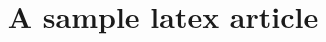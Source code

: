 \documentclass[12pt]{article}
\begin{document}
    \title{A sample latex article}
    \maketitle
\end{document}

